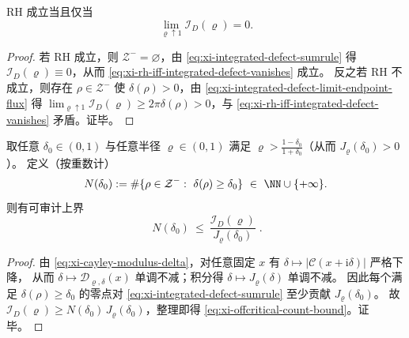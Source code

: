 \begin{corollary}\label{cor:xi-scalar-certificate-integrated-defect}
RH 成立当且仅当
\begin{equation}\label{eq:xi-rh-iff-integrated-defect-vanishes}
\boxed{\;\lim_{\varrho\uparrow 1}\mathcal{I}_D(\varrho)=0.\;}
\end{equation}
\end{corollary}

\begin{proof}
若 RH 成立，则 \(\mathcal{Z}^-=\varnothing\)，由 \eqref{eq:xi-integrated-defect-sumrule} 得 \(\mathcal{I}_D(\varrho)\equiv 0\)，从而 \eqref{eq:xi-rh-iff-integrated-defect-vanishes} 成立。
反之若 RH 不成立，则存在 \(\rho\in\mathcal{Z}^-\) 使 \(\delta(\rho)>0\)，由 \eqref{eq:xi-integrated-defect-limit-endpoint-flux} 得
\(
\lim_{\varrho\uparrow 1}\mathcal{I}_D(\varrho)\ge 2\pi\delta(\rho)>0
\)，与 \eqref{eq:xi-rh-iff-integrated-defect-vanishes} 矛盾。证毕。
\end{proof}



\begin{corollary}[离临界线偏移的计数上界]\label{cor:xi-offcritical-count-bound-by-integrated-defect}
取任意 \(\delta_0\in(0,1)\) 与任意半径 \(\varrho\in(0,1)\) 满足 \(\varrho>\frac{1-\delta_0}{1+\delta_0}\)（从而 \(J_{\varrho}(\delta_0)>0\)）。
定义（按重数计）
\[
N(\delta_0):=\#\{\rho\in\mathcal{Z}^-:\ \delta(\rho)\ge \delta_0\}\ \in\ \NN\cup\{+\infty\}.
\]
则有可审计上界
\begin{equation}\label{eq:xi-offcritical-count-bound}
\boxed{\;
N(\delta_0)\ \le\ \frac{\mathcal{I}_D(\varrho)}{J_{\varrho}(\delta_0)}\; }.
\end{equation}
\end{corollary}

\begin{proof}
由 \eqref{eq:xi-cayley-modulus-delta}，对任意固定 \(x\) 有 \(\delta\mapsto |\mathcal{C}(x+\mathrm{i}\delta)|\) 严格下降，
从而 \(\delta\mapsto \mathcal{D}_{\varrho,\delta}(x)\) 单调不减；积分得 \(\delta\mapsto J_{\varrho}(\delta)\) 单调不减。
因此每个满足 \(\delta(\rho)\ge\delta_0\) 的零点对 \eqref{eq:xi-integrated-defect-sumrule} 至少贡献 \(J_{\varrho}(\delta_0)\)。
故 \(\mathcal{I}_D(\varrho)\ge N(\delta_0)\,J_{\varrho}(\delta_0)\)，整理即得 \eqref{eq:xi-offcritical-count-bound}。证毕。
\end{proof}

